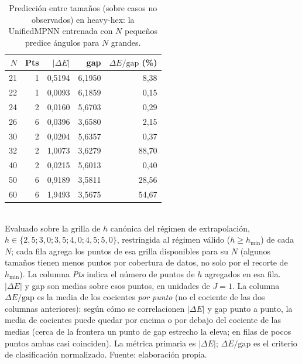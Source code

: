 \begin{table}[htbp]
\centering
\caption[Predicción a $N$ grande (heavy-hex)]{Predicción entre tamaños (sobre casos no observados) en heavy-hex: la UnifiedMPNN entrenada con $N$ pequeños predice ángulos para $N$ grandes.}
\label{tab:auto_heavy_hex_large_n}
\begin{tabular}{rrrrr}
\toprule
$N$ & Pts & $|\Delta E|$ & gap & $\Delta E/\mathrm{gap}$ (\%) \\
\midrule
21 & 1 & 0,5194 & 6,1950 & 8,38 \\
22 & 1 & 0,0093 & 6,1859 & 0,15 \\
24 & 2 & 0,0160 & 5,6703 & 0,29 \\
26 & 6 & 0,0396 & 3,6580 & 2,15 \\
30 & 2 & 0,0204 & 5,6357 & 0,37 \\
32 & 2 & 1,0073 & 3,6279 & 88,70 \\
40 & 2 & 0,0215 & 5,6013 & 0,40 \\
50 & 6 & 0,9189 & 3,5811 & 28,56 \\
60 & 6 & 1,9493 & 3,5675 & 54,67 \\
\bottomrule
\end{tabular}
\\[2pt]
\footnotesize Evaluado sobre la grilla de $h$ canónica del régimen de extrapolación, $h \in \{2,5; 3,0; 3,5; 4,0; 4,5; 5,0\}$, restringida al régimen válido ($h \geq h_{\min}$) de cada $N$; cada fila agrega los puntos de esa grilla disponibles para su $N$ (algunos tamaños tienen menos puntos por cobertura de datos, no solo por el recorte de $h_{\min}$). La columna \emph{Pts} indica el número de puntos de $h$ agregados en esa fila. $|\Delta E|$ y gap son medias sobre esos puntos, en unidades de $J = 1$. La columna $\Delta E/\mathrm{gap}$ es la media de los cocientes \emph{por punto} (no el cociente de las dos columnas anteriores): según cómo se correlacionen $|\Delta E|$ y gap punto a punto, la media de cocientes puede quedar por encima o por debajo del cociente de las medias (cerca de la frontera un punto de gap estrecho la eleva; en filas de pocos puntos ambas casi coinciden). La métrica primaria es $|\Delta E|$; $\Delta E/\mathrm{gap}$ es el criterio de clasificación normalizado. Fuente: elaboración propia.
\end{table}
